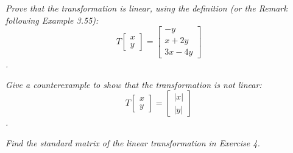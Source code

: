 \documentclass[12pt,letterpaper]{hmcpset}
\begin{document}
\newpage


\begin{problem}[3.6.4]
    \textit{Prove that the transformation is linear, using the definition (or the Remark following Example 3.55):
    \[
    T\begin{bmatrix}
    x \\ y
    \end{bmatrix} = 
    \begin{bmatrix}
    -y \\ x+2y\\ 3x-4y
    \end{bmatrix}
    \].}
\end{problem}

\begin{solution}
    \vfill
\end{solution}

\newpage


\begin{problem}[3.6.8]
    \textit{Give a counterexample to show that the transformation is not linear:
    \[
    T\begin{bmatrix}
    x \\ y
    \end{bmatrix} = 
    \begin{bmatrix}
    |x| \\ |y|
    \end{bmatrix}
    \].}
\end{problem}

\begin{solution}
    \vfill
\end{solution}

\newpage


\begin{problem}[3.6.12]
   \textit{ Find the standard matrix of the linear transformation in Exercise 4.}
\end{problem}

\begin{solution}
    \vfill
\end{solution}

\newpage

\end{document}
